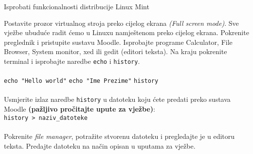  \begin{zadatak} Isprobati funkcionalnosti distribucije Linux Mint

Postavite prozor virtualnog stroja preko cijelog ekrana \textit{(Full screen mode)}. Sve vježbe ubuduće radit ćemo u Linuxu namještenom preko cijelog ekrana. Pokrenite preglednik i pristupite sustavu Moodle. Isprobajte programe Calculator, File Browser, System monitor, xed ili gedit (editori teksta). Na kraju pokrenite terminal i isprobajte naredbe \texttt{echo} i \texttt{history}.
\\
\\
\texttt{echo "Hello world"}\break
\texttt{echo "Ime Prezime"}\break
\texttt{history}
\\
\\
Usmjerite izlaz naredbe \texttt{history} u datoteku koju ćete predati preko sustava Moodle \textbf{(pažljivo pročitajte upute za vježbe)}:\\
\texttt{history  \textgreater \  naziv\_datoteke}
\\
\\
Pokrenite \textit{file manager}, potražite stvorenu datoteku i pregledajte je u editoru teksta.
Predajte datoteku na način opisan u uputama za vježbe.

\end{zadatak}